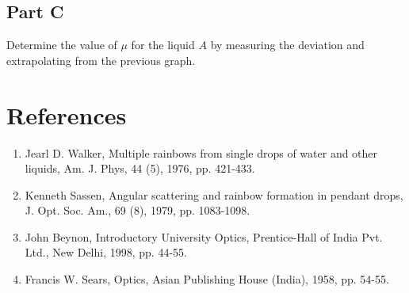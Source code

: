 \subsection*{Part C}
Determine the value of $\mu$ for the liquid $A$ by measuring the deviation and extrapolating from the previous graph.



\section*{References}
\begin{enumerate}
\item Jearl D. Walker, Multiple rainbows from single drops of water and other liquids, Am. J. Phys, 44 (5), 1976, pp. 421-433.
\item Kenneth Sassen, Angular scattering and rainbow formation in pendant drops, J. Opt. Soc. Am., 69 (8), 1979, pp. 1083-1098. 
\item John Beynon, Introductory University Optics, Prentice-Hall of India Pvt. Ltd., New Delhi, 1998, pp. 44-55.
\item Francis W. Sears, Optics, Asian Publishing House (India), 1958, pp. 54-55. 

\end{enumerate}

